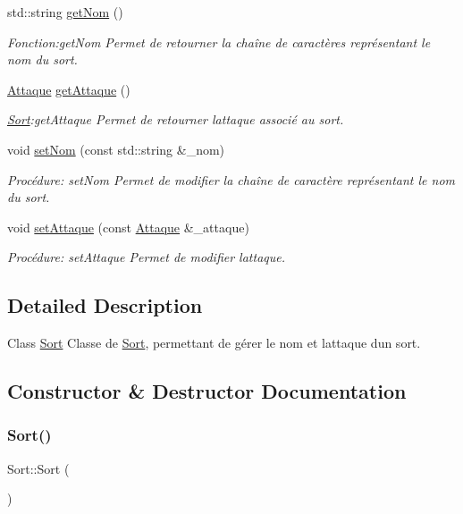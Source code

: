\begin{DoxyCompactItemize}
std\+::string \hyperlink{classSort_a249f3b41badad1b1fa14b3bf6d3736f3}{get\+Nom} ()
\begin{DoxyCompactList}\small\item\em Fonction\+:get\+Nom Permet de retourner la chaîne de caractères représentant le nom du sort. \end{DoxyCompactList}\item 
\hyperlink{classAttaque}{Attaque} \hyperlink{classSort_ac24b0d4c2caf033df5ddcc3f281bc634}{get\+Attaque} ()
\begin{DoxyCompactList}\small\item\em \hyperlink{classSort}{Sort}\+:get\+Attaque Permet de retourner l\textquotesingle{}attaque associé au sort. \end{DoxyCompactList}\item 
void \hyperlink{classSort_af1eb5e9ab593b1c6b9e1d94ad1117b4f}{set\+Nom} (const std\+::string \&\+\_\+nom)
\begin{DoxyCompactList}\small\item\em Procédure\+: set\+Nom Permet de modifier la chaîne de caractère représentant le nom du sort. \end{DoxyCompactList}\item 
void \hyperlink{classSort_ae8380b142e31fdad8afae89bbfaeffc5}{set\+Attaque} (const \hyperlink{classAttaque}{Attaque} \&\+\_\+attaque)
\begin{DoxyCompactList}\small\item\em Procédure\+: set\+Attaque Permet de modifier l\textquotesingle{}attaque. \end{DoxyCompactList}\end{DoxyCompactItemize}


\subsection{Detailed Description}
Class \hyperlink{classSort}{Sort} Classe de \hyperlink{classSort}{Sort}, permettant de gérer le nom et l\textquotesingle{}attaque d\textquotesingle{}un sort. 

\subsection{Constructor \& Destructor Documentation}
\mbox{\label{classSort_a89ab0e273ec62afb2c1a3b7fc5671503}} 
\subsubsection{\texorpdfstring{Sort()}{Sort()}\hspace{0.1cm}{\footnotesize\ttfamily [1/3]}}
{\footnotesize\ttfamily Sort\+::\+Sort (\begin{DoxyParamCaption}{ }\end{DoxyParamCaption})}



